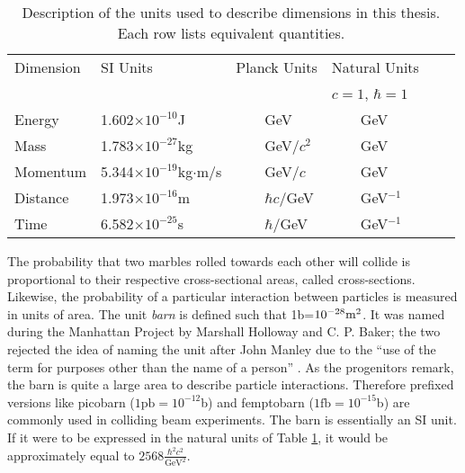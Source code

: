 \begin{table}[htp]
\caption{Description of the units used to describe dimensions in this thesis. Each row lists equivalent quantities.}
\begin{center}
\begin{tabular}{l l l l l l}
\toprule
Dimension & SI Units &  Planck Units & Natural Units \\
          &          &               & $c=1$, $\hbar = 1$ \\
\midrule
Energy    &    1.602$\times10^{-10}$J               & ~~~~GeV            & ~~~~GeV \\
Mass      &    1.783$\times10^{-27}$kg              & ~~~~GeV/$c^2$      & ~~~~GeV \\
Momentum  &    5.344$\times10^{-19}$kg$\cdot$m/s    & ~~~~GeV/$c$        & ~~~~GeV \\
Distance  &    1.973$\times10^{-16}$m               & ~~~~$\hbar c/$GeV  & ~~~~GeV$^{-1}$ \\
Time      &    6.582$\times10^{-25}$s               & ~~~~$\hbar/$GeV    & ~~~~GeV$^{-1}$ \\
\bottomrule
\end{tabular}
\label{tab:units}
\end{center}
\end{table}

The probability that two marbles rolled towards each other will collide is proportional to their respective cross-sectional areas, called cross-sections.
Likewise, the probability of a particular interaction between particles is measured in units of area.
The unit \emph{barn} is defined such that 1b=$10^{-28}\text m^2$.
It was named during the Manhattan Project by Marshall Holloway and C. P. Baker; the two rejected the idea of naming the unit after John Manley due to the ``use of the term for purposes other than the name of a person'' \cite{holloway}.
As the progenitors remark, the barn is quite a large area to describe particle interactions.
Therefore prefixed versions like picobarn ($1\text{pb}=10^{-12}$b) and femptobarn ($1\text{fb}=10^{-15}$b) are commonly used in colliding beam experiments.
The barn is essentially an SI unit. If it were to be expressed in the natural units of Table \ref{tab:units}, it would be approximately equal to $2568\frac{\hbar^2 c^2}{\text{GeV}^2}$.

